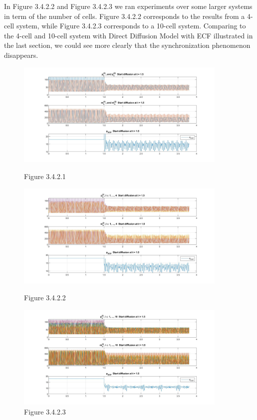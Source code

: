 \documentclass[12pt]{article}
\renewcommand{\(}{\left (}
\renewcommand{\)}{\right )}
\begin{document}
In Figure 3.4.2.2 and Figure 3.4.2.3 we ran experiments over some larger systems in term of the number of cells. Figure 3.4.2.2 corresponds to the results from a 4-cell system, while Figure 3.4.2.3 corresponds to a 10-cell system. Comparing to the 4-cell and 10-cell system with Direct Diffusion Model with ECF illustrated in the last section, we could see more clearly that the synchronization phenomenon disappears.



\begin{figure}[!]
    \centering
	\begin{minipage}{0.9\textwidth}
		\centering
		\includegraphics[width=0.9\textwidth]{PF_UU.jpg}
		\caption*{\small Figure 3.4.2.1}
	\end{minipage}
	\begin{minipage}{0.9\textwidth}
		\centering
		\includegraphics[width=0.9\textwidth]{PF_UU_4.jpg}
		\caption*{\small Figure 3.4.2.2}
	\end{minipage}
	\begin{minipage}{0.9\textwidth}
		\centering
		\includegraphics[width=0.9\textwidth]{PF_UU_10.jpg}
		\caption*{\small Figure 3.4.2.3}
	\end{minipage}
\end{figure}
\end{document}
